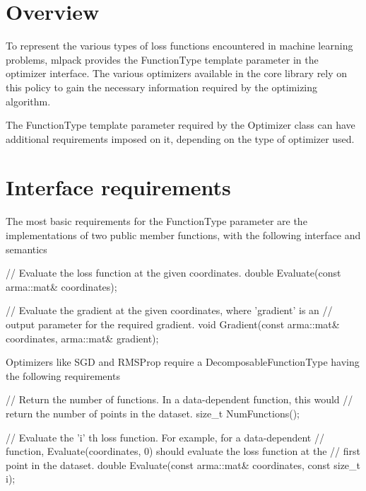 \section{Overview}\label{function_Overview}
To represent the various types of loss functions encountered in machine learning problems, mlpack provides the {\ttfamily Function\+Type} template parameter in the optimizer interface. The various optimizers available in the core library rely on this policy to gain the necessary information required by the optimizing algorithm.

The {\ttfamily Function\+Type} template parameter required by the Optimizer class can have additional requirements imposed on it, depending on the type of optimizer used.\section{Interface requirements}\label{function_requirements}
The most basic requirements for the {\ttfamily Function\+Type} parameter are the implementations of two public member functions, with the following interface and semantics


\begin{DoxyCode}
\textcolor{comment}{// Evaluate the loss function at the given coordinates.}
\textcolor{keywordtype}{double} Evaluate(\textcolor{keyword}{const} arma::mat& coordinates);
\end{DoxyCode}



\begin{DoxyCode}
\textcolor{comment}{// Evaluate the gradient at the given coordinates, where 'gradient' is an}
\textcolor{comment}{// output parameter for the required gradient.}
\textcolor{keywordtype}{void} Gradient(\textcolor{keyword}{const} arma::mat& coordinates, arma::mat& gradient);
\end{DoxyCode}


Optimizers like S\+GD and R\+M\+S\+Prop require a {\ttfamily Decomposable\+Function\+Type} having the following requirements


\begin{DoxyCode}
\textcolor{comment}{// Return the number of functions. In a data-dependent function, this would}
\textcolor{comment}{// return the number of points in the dataset.}
\textcolor{keywordtype}{size\_t} NumFunctions();
\end{DoxyCode}



\begin{DoxyCode}
\textcolor{comment}{// Evaluate the 'i' th loss function. For example, for a data-dependent}
\textcolor{comment}{// function, Evaluate(coordinates, 0) should evaluate the loss function at the}
\textcolor{comment}{// first point in the dataset.}
\textcolor{keywordtype}{double} Evaluate(\textcolor{keyword}{const} arma::mat& coordinates, \textcolor{keyword}{const} \textcolor{keywordtype}{size\_t} i);
\end{DoxyCode}



